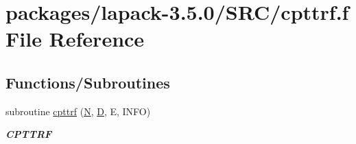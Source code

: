 \hypertarget{cpttrf_8f}{}\section{packages/lapack-\/3.5.0/\+S\+R\+C/cpttrf.f File Reference}
\label{cpttrf_8f}
\subsection*{Functions/\+Subroutines}
\begin{DoxyCompactItemize}
\item 
subroutine \hyperlink{group__complexPTcomputational_gab4ab4f156ac9e5e7e67f4c45b6033ba6}{cpttrf} (\hyperlink{polmisc_8c_a0240ac851181b84ac374872dc5434ee4}{N}, \hyperlink{odrpack_8h_a7dae6ea403d00f3687f24a874e67d139}{D}, E, I\+N\+F\+O)
\begin{DoxyCompactList}\small\item\em {\bfseries C\+P\+T\+T\+R\+F} \end{DoxyCompactList}\end{DoxyCompactItemize}
